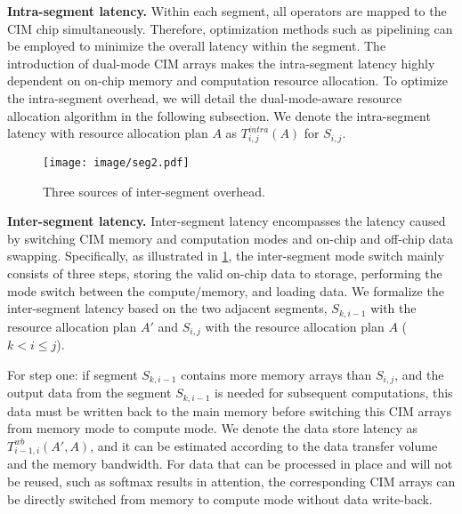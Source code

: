 \noindent
\textbf{Intra-segment latency.} Within each segment, all operators are mapped to the CIM chip simultaneously. Therefore, optimization methods such as pipelining can be employed to minimize the overall latency within the segment. The introduction of dual-mode CIM arrays makes the intra-segment latency highly dependent on on-chip memory and computation resource allocation. To optimize the intra-segment overhead, we will detail the dual-mode-aware resource allocation algorithm in the following subsection. We denote the intra-segment latency with resource allocation plan $A$ as $T_{i,j}^{intra}(A)$ for $S_{i,j}$.

\begin{figure}[t]
    \centering
    \texttt{[image: image/seg2.pdf]}
    \caption{Three sources of inter-segment overhead.}
    \label{fig:seg2}
\end{figure}

\noindent
\textbf{Inter-segment latency.} Inter-segment latency encompasses the latency caused by switching CIM memory and computation modes and on-chip and off-chip data swapping. 
Specifically, as illustrated in \fig \ref{fig:seg2}, the inter-segment mode switch mainly consists of three steps, storing the valid on-chip data to storage, performing the mode switch between the compute/memory, and loading data. 
We formalize the inter-segment latency based on the two adjacent segments, $S_{k,i-1}$ with the resource allocation plan $A'$ and $S_{i,j}$ with the resource allocation plan $A$ ($k< i\leq j$).

For step one: if segment $S_{k,i-1}$ contains more memory arrays than $S_{i,j}$, and the output data from the segment $S_{k,i-1}$ is needed for subsequent computations, this data must be written back to the main memory before switching this CIM arrays from memory mode to compute mode. We denote the data store latency as $T_{i-1,i}^{wb}(A',A)$, and it can be estimated according to the data transfer volume and the memory bandwidth.
For data that can be processed in place and will not be reused, such as softmax results in attention, the corresponding CIM arrays can be directly switched from memory to compute mode without data write-back.

